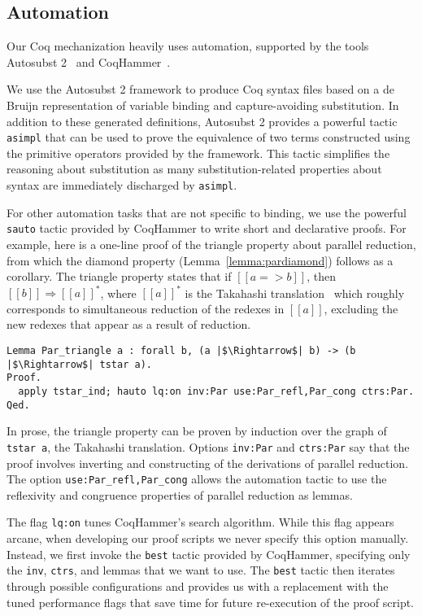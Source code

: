 \documentclass[\ifpublic nolinenum\else\fi,online,OA]{jfp}
\theoremstyle{definition}
\begin{document}
\subsection{Automation}
\label{sec:automation}
Our Coq mechanization heavily uses automation, supported by the tools
Autosubst 2~\citep{autosubst2} and CoqHammer~\citep{czajka2018hammer}.

We use the Autosubst 2 framework to produce Coq syntax files based on a de
Bruijn representation of variable binding and capture-avoiding substitution.
In addition to these generated definitions, Autosubst 2 provides a powerful
tactic \texttt{asimpl} that can be used to prove the equivalence of two terms
constructed using the primitive operators provided by the framework. This
tactic simplifies the reasoning about substitution as many
substitution-related properties about syntax are immediately discharged by
\texttt{asimpl}.

For other automation tasks that are not specific to binding, we use
the powerful \texttt{sauto} tactic provided by CoqHammer to write
short and declarative proofs. For example, here is a one-line proof of
the triangle property about parallel reduction, from which the diamond
property (Lemma~\ref{lemma:pardiamond}) follows as a corollary.
The triangle property states
that if $[[a => b]]$, then $[[b]]\Rightarrow [[a]]^*$, where $[[a]]^*$
is the Takahashi translation~\citep{takahashi-parallel-reduction}
which roughly corresponds to simultaneous reduction of the redexes in
$[[a]]$, excluding the new redexes that appear as a result of
reduction.
\begin{verbatim}
Lemma Par_triangle a : forall b, (a |$\Rightarrow$| b) -> (b |$\Rightarrow$| tstar a).
Proof.
  apply tstar_ind; hauto lq:on inv:Par use:Par_refl,Par_cong ctrs:Par.
Qed.
\end{verbatim}
In prose, the triangle property can be proven by induction over the graph of
\texttt{tstar a}, the Takahashi translation. Options \texttt{inv:Par}
and \texttt{ctrs:Par} say that the proof involves inverting and constructing
of the derivations of parallel reduction. The option
\texttt{use:Par\_refl,Par\_cong} allows the automation tactic to use the
reflexivity and congruence properties of parallel reduction as lemmas.

The flag \texttt{lq:on} tunes CoqHammer's search algorithm.  While this flag
appears arcane, when developing our proof scripts we never specify this option
manually. Instead, we first invoke the \texttt{best} tactic provided by
CoqHammer, specifying only the \texttt{inv}, \texttt{ctrs}, and lemmas that we
want to use. The \texttt{best} tactic then iterates through possible
configurations and provides us with a replacement with the tuned performance
flags that save time for future re-execution of the proof script.
\end{document}

